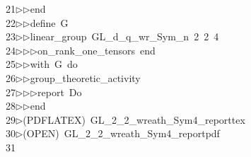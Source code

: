 \begin{tabbing}
21\>$\triangleright$\>$\triangleright$\>end\ \\[0pt]
22\>$\triangleright$\>$\triangleright$\>define\ G\ \\[0pt]
23\>$\triangleright$\>$\triangleright$\>linear\_group\ GL\_d\_q\_wr\_Sym\_n\ 2\ 2\ 4\ \\[0pt]
24\>$\triangleright$\>$\triangleright$\>$\triangleright$\>on\_rank\_one\_tensors\ end\ \\[0pt]
25\>$\triangleright$\>$\triangleright$\>with\ G\ do\ \\[0pt]
26\>$\triangleright$\>$\triangleright$\>group\_theoretic\_activity\ \\[0pt]
27\>$\triangleright$\>$\triangleright$\>$\triangleright$\>report\ Do\ \\[0pt]
28\>$\triangleright$\>$\triangleright$\>end\\[0pt]
29\>$\triangleright$\>(PDFLATEX)\ GL\_2\_2\_wreath\_Sym4\_reporttex\\[0pt]
30\>$\triangleright$\>(OPEN)\ GL\_2\_2\_wreath\_Sym4\_reportpdf\\[0pt]
31\>\end{tabbing}
